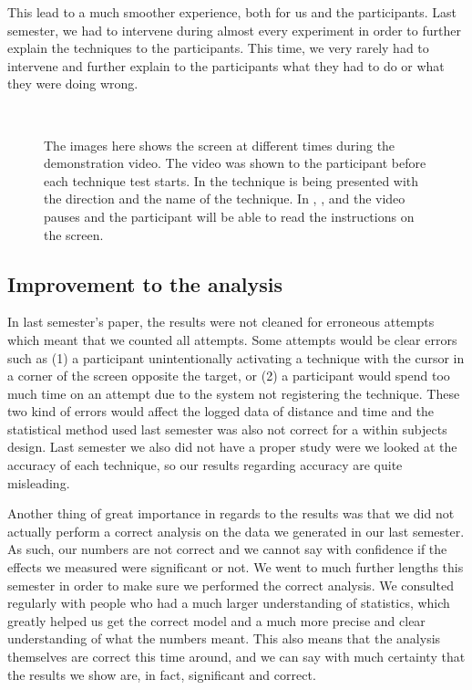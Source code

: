 This lead to a much smoother experience, both for us and the participants.
Last semester, we had to intervene during almost every experiment in order to further explain the techniques to the participants.
This time, we very rarely had to intervene and further explain to the participants what they had to do or what they were doing wrong.

\begin{figure}[H]
\\
\caption{The images here shows the screen at different times during the demonstration video. The video was shown to the participant before each technique test starts. In \protect{} the technique is being presented with the direction and the name of the technique. In \protect{}, \protect{}, and \protect{} the video pauses and the participant will be able to read the instructions on the screen.}
\label{fig:demovideo}
\end{figure}

\subsection*{Improvement to the analysis}
In last semester's paper, the results were not cleaned for erroneous attempts which meant that we counted all attempts. 
Some attempts would be clear errors such as (1) a participant unintentionally activating a technique with the cursor in a corner of the screen opposite the target, or (2) a participant would spend too much time on an attempt due to the system not registering the technique.
These two kind of errors would affect the logged data of distance and time and the statistical method used last semester was also not correct for a within subjects design.
Last semester we also did not have a proper study were we looked at the accuracy of each technique, so our results regarding accuracy are quite misleading. 

Another thing of great importance in regards to the results was that we did not actually perform a correct analysis on the data we generated in our last semester.
As such, our numbers are not correct and we cannot say with confidence if the effects we measured were significant or not. 
We went to much further lengths this semester in order to make sure we performed the correct analysis. 
We consulted regularly with people who had a much larger understanding of statistics, which greatly helped us get the correct model and a much more precise and clear understanding of what the numbers meant. 
This also means that the analysis themselves are correct this time around, and we can say with much certainty that the results we show are, in fact, significant and correct.  
